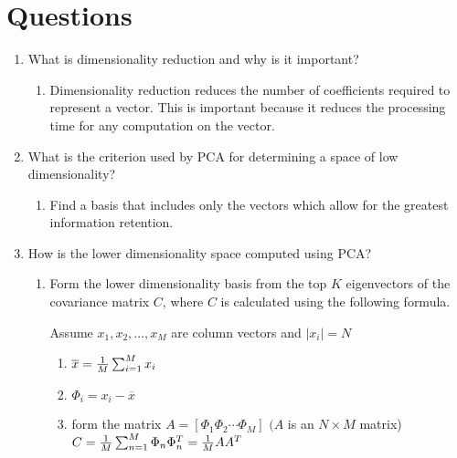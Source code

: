 \section{Questions}

\begin{enumerate}

  \item What is dimensionality reduction and why is it important?

  \begin{enumerate}
    \item Dimensionality reduction reduces the number of coefficients required to
          represent a vector.  This is important because it reduces the processing
          time for any computation on the vector.
  \end{enumerate}

  \item What is the criterion used by PCA for determining a space of low dimensionality?

  \begin{enumerate}
    \item Find a basis that includes only the vectors which allow for the greatest information retention.
  \end{enumerate}

  \item How is the lower dimensionality space computed using PCA?

  \begin{enumerate}
    \item Form the lower dimensionality basis from the top $K$ eigenvectors of the
          covariance matrix $C$, where $C$ is calculated using the following formula.

    Assume $x_1, x_2, ..., x_M$ are column vectors and $|x_i|=N$
    \begin{enumerate}
      \item $\overline{x} = {1 \over M} \sum_{i=1}^M x_i$
      \item $\Phi_i = x_i - \overline{x}$
      \item form the matrix $A = [\Phi_1 \Phi_2 \cdots \Phi_M]$ \hspace{10pt} $(A$ is an $N \times M$ matrix)
      \\

      $C = {1 \over M} \sum_{n=1}^M \Phi_n \Phi_n^T = {1 \over M} AA^T$
    \end{enumerate}
  \end{enumerate}


\end{enumerate}
